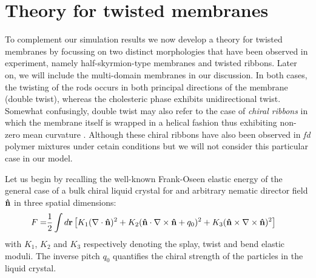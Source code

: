 \section{Theory for twisted membranes}


 To complement our simulation results we now develop a theory for twisted membranes by focussing on two distinct morphologies that have been observed in experiment, namely half-skyrmion-type membranes and twisted ribbons. Later on, we will include the multi-domain membranes in our discussion.  In both cases, the twisting of the rods occurs in both principal directions of the membrane (double twist), whereas the cholesteric phase exhibits unidirectional twist. Somewhat confusingly, double twist may also refer to the case of {\em chiral ribbons} in which the membrane itself is wrapped
in a helical fashion thus exhibiting non-zero mean curvature \cite{green1936equilibrium,chopin2016roadmap}. Although these chiral ribbons have also been observed in {\em fd} polymer mixtures under cetain conditions \cite{Gibaud2012} but we will not consider this particular case in our model.
 
 
 Let us begin by recalling the well-known Frank-Oseen elastic energy of the general case of a bulk chiral liquid crystal for and arbitrary nematic director field ${\bf \hat{n}}$ in three spatial dimensions:
\begin{align} 
F = & \frac{1}{2} \int d {\bf r} \left [ K_{1} (\nabla \cdot {\bf \hat{n}})^{2}  + K_{2} ({\bf \hat{n}} \cdot \nabla \times {\bf \hat{n}} + q_{0})^{2}  +   K_{3} ({\bf \hat{n}} \times \nabla \times {\bf \hat{n}})^{2} \right ]  
\end{align}
with $K_{1}$, $K_{2}$ and $K_{3}$ respectively denoting the splay, twist and bend elastic moduli.   The inverse  pitch  $q_{0}$ quantifies the chiral strength of the particles in the liquid crystal.


